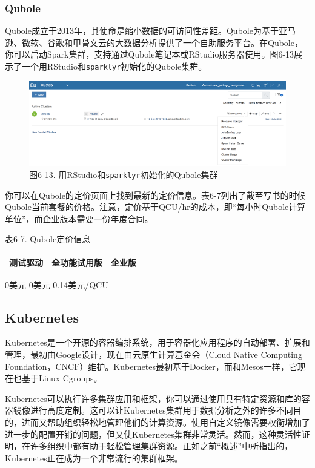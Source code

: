 \documentclass[
]{article}
\begin{document}
\hypertarget{qubole}{%
\subsubsection{Qubole}\label{qubole}}

Qubole成立于2013年，其使命是缩小数据的可访问性差距。Qubole为基于亚马逊、微软、谷歌和甲骨文云的大数据分析提供了一个自助服务平台。在Qubole，你可以启动Spark集群，支持通过Qubole笔记本或RStudio服务器使用。图6-13展示了一个用RStudio和\texttt{sparklyr}初始化的Qubole集群。

\begin{figure}
\centering
\includegraphics{figures/6_13.png}
\caption{图6-13. 用RStudio和\texttt{sparklyr}初始化的Qubole集群}
\end{figure}

你可以在Qubole的定价页面上找到最新的定价信息。表6-7列出了截至写书的时候Qubole当前套餐的价格。注意，定价基于QCU/hr的成本，即``每小时Qubole计算单位''，而企业版本需要一份年度合同。

表6-7. Qubole定价信息

\begin{longtable}[]{@{}lll@{}}
\toprule
测试驱动 & 全功能试用版 & 企业版\tabularnewline
\midrule
\endhead
\bottomrule
\end{longtable}

0美元 0美元 0.14美元/QCU

\hypertarget{kubernetes}{%
\subsection{Kubernetes}\label{kubernetes}}

Kubernetes是一个开源的容器编排系统，用于容器化应用程序的自动部署、扩展和管理，最初由Google设计，现在由云原生计算基金会（Cloud
Native Computing
Foundation，CNCF）维护。Kubernetes最初基于Docker，而和Mesos一样，它现在也基于Linux
Cgroups。

Kubernetes可以执行许多集群应用和框架，你可以通过使用具有特定资源和库的容器镜像进行高度定制。这可以让Kubernetes集群用于数据分析之外的许多不同目的，进而又帮助组织轻松地管理他们的计算资源。使用自定义镜像需要权衡增加了进一步的配置开销的问题，但又使Kubernetes集群非常灵活。然而，这种灵活性证明，在许多组织中都有助于轻松管理集群资源。正如之前``概述''中所指出的，Kubernetes正在成为一个非常流行的集群框架。
\end{document}
